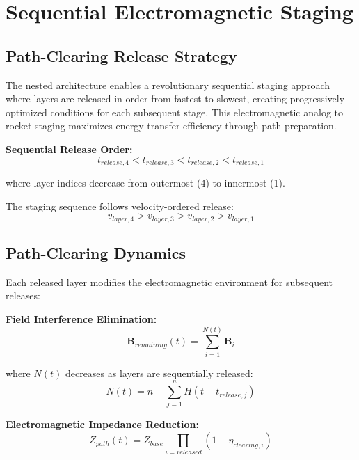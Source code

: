 \documentclass[12pt,a4paper]{article}
\begin{document}
\section{Sequential Electromagnetic Staging}

\subsection{Path-Clearing Release Strategy}

The nested architecture enables a revolutionary sequential staging approach where layers are released in order from fastest to slowest, creating progressively optimized conditions for each subsequent stage. This electromagnetic analog to rocket staging maximizes energy transfer efficiency through path preparation.

\textbf{Sequential Release Order:}
\begin{equation}
t_{release,4} < t_{release,3} < t_{release,2} < t_{release,1}
\end{equation}

where layer indices decrease from outermost (4) to innermost (1).

The staging sequence follows velocity-ordered release:
\begin{equation}
v_{layer,4} > v_{layer,3} > v_{layer,2} > v_{layer,1}
\end{equation}

\subsection{Path-Clearing Dynamics}

Each released layer modifies the electromagnetic environment for subsequent releases:

\textbf{Field Interference Elimination:}
\begin{equation}
\mathbf{B}_{remaining}(t) = \sum_{i=1}^{N(t)} \mathbf{B}_i
\end{equation}

where $N(t)$ decreases as layers are sequentially released:
\begin{equation}
N(t) = n - \sum_{j=1}^{n} H(t - t_{release,j})
\end{equation}

\textbf{Electromagnetic Impedance Reduction:}
\begin{equation}
Z_{path}(t) = Z_{base} \prod_{i=released} (1 - \eta_{clearing,i})
\end{equation}
\end{document}
